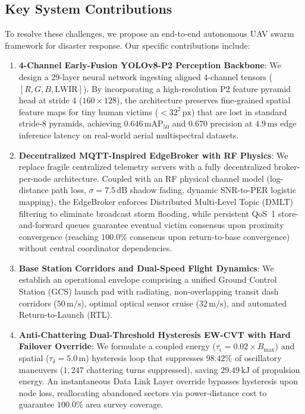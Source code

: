 \documentclass[conference]{IEEEtran}
\begin{document}
\subsection{Key System Contributions}
To resolve these challenges, we propose an end-to-end autonomous UAV swarm framework for disaster response. Our specific contributions include:
\begin{enumerate}
    \item \textbf{4-Channel Early-Fusion YOLOv8-P2 Perception Backbone}: We design a 29-layer neural network ingesting aligned 4-channel tensors ($[R, G, B, \text{LWIR}]$). By incorporating a high-resolution P2 feature pyramid head at stride 4 ($160 \times 128$), the architecture preserves fine-grained spatial feature maps for tiny human victims ($<32^2\,\text{px}$) that are lost in standard stride-8 pyramids, achieving $0.646\,\text{mAP}_{50}$ and $0.670$ precision at $4.9\,\text{ms}$ edge inference latency on real-world aerial multispectral datasets.
    \item \textbf{Decentralized MQTT-Inspired EdgeBroker with RF Physics}: We replace fragile centralized telemetry servers with a fully decentralized broker-per-node architecture. Coupled with an RF physical channel model (log-distance path loss, $\sigma = 7.5\,\text{dB}$ shadow fading, dynamic SNR-to-PER logistic mapping), the EdgeBroker enforces Distributed Multi-Level Topic (DMLT) filtering to eliminate broadcast storm flooding, while persistent QoS~1 store-and-forward queues guarantee eventual victim consensus upon proximity convergence (reaching $100.0\%$ consensus upon return-to-base convergence) without central coordinator dependencies.
    \item \textbf{Base Station Corridors and Dual-Speed Flight Dynamics}: We establish an operational envelope comprising a unified Ground Control Station (GCS) launch pad with radiating, non-overlapping transit dash corridors ($50\,\text{m/s}$), optimal optical sensor cruise ($32\,\text{m/s}$), and automated Return-to-Launch (RTL).
    \item \textbf{Anti-Chattering Dual-Threshold Hysteresis EW-CVT with Hard Failover Override}: We formulate a coupled energy ($\tau_\epsilon = 0.02 \times B_{\text{max}}$) and spatial ($\tau_\delta = 5.0\,\text{m}$) hysteresis loop that suppresses $98.42\%$ of oscillatory maneuvers ($1,247$ chattering turns suppressed), saving $29.49\,\text{kJ}$ of propulsion energy. An instantaneous Data Link Layer override bypasses hysteresis upon node loss, reallocating abandoned sectors via power-distance cost to guarantee $100.0\%$ area survey coverage.
\end{enumerate}
\end{document}
